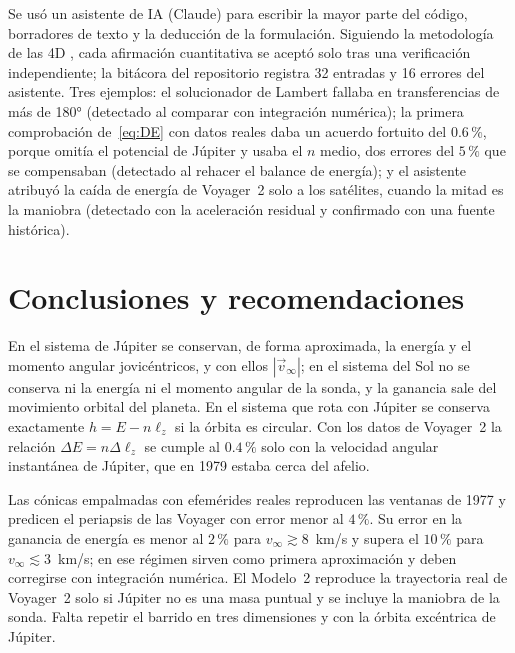 \documentclass[11pt,letterpaper]{article}
\newcommand{\vinf}{v_\infty}
\begin{document}
Se usó un asistente de IA (Claude) para escribir la mayor parte del código, borradores de
texto y la deducción de la formulación. Siguiendo la metodología de las 4D \cite{dakan2025},
cada afirmación cuantitativa se aceptó solo tras una verificación independiente; la bitácora
del repositorio registra 32 entradas y 16 errores del asistente. Tres ejemplos: el solucionador
de Lambert fallaba en transferencias de más de \ang{180} (detectado al comparar con integración
numérica); la primera comprobación de~\eqref{eq:DE} con datos reales daba un acuerdo fortuito
del $0.6\,\%$, porque omitía el potencial de Júpiter y usaba el $n$ medio, dos errores del
$5\,\%$ que se compensaban (detectado al rehacer el balance de energía); y el
asistente atribuyó la caída de energía de Voyager~2 solo a los satélites, cuando la mitad es la
maniobra (detectado con la aceleración residual y confirmado con una fuente histórica).

\section{Conclusiones y recomendaciones}\label{sec:conclusiones}

En el sistema de Júpiter se conservan, de forma aproximada, la energía y el momento angular
jovicéntricos, y con ellos $|\vec v_\infty|$; en el sistema del Sol no se conserva ni la energía
ni el momento angular de la sonda, y la ganancia sale del movimiento orbital del planeta. En el
sistema que rota con Júpiter se conserva exactamente $h = E - n\ell_z$ si la órbita es circular.
Con los datos de Voyager~2 la relación $\Delta E = n\Delta\ell_z$ se cumple al $0.4\,\%$ solo con
la velocidad angular instantánea de Júpiter, que en 1979 estaba cerca del afelio.

Las cónicas empalmadas con efemérides reales reproducen las ventanas de 1977 y predicen el
periapsis de las Voyager con error menor al $4\,\%$. Su error en la ganancia de energía es menor
al $2\,\%$ para $\vinf\gtrsim 8$~km/s y supera el $10\,\%$ para $\vinf\lesssim 3$~km/s; en ese
régimen sirven como primera aproximación y deben corregirse con integración numérica. El
Modelo~2 reproduce la trayectoria real de Voyager~2 solo si Júpiter no es una masa puntual y se
incluye la maniobra de la sonda. Falta repetir el barrido en tres dimensiones y con la órbita excéntrica de Júpiter.
\end{document}
